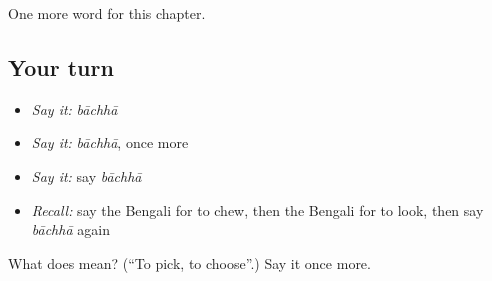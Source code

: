 \begin{grammarlens}[title={What you've built}]
One more word for this chapter.
\end{grammarlens}

\subsection*{Your turn}
\begin{itemize}
\raggedright
  \item \emph{Say it:} \emph{bāchhā}
  \item \emph{Say it:} \emph{bāchhā}, once more
  \item \emph{Say it:} say \emph{bāchhā}
  \item \emph{Recall:} say the Bengali for to chew, then the Bengali for to look, then say \emph{bāchhā} again
\end{itemize}

\begin{tcolorbox}[breakable,colback=teal!4,colframe=teal!35!black,title={Before you move on}]
What does  mean? (\textquotedblleft{}To pick, to choose\textquotedblright{}.) Say it once more.
\end{tcolorbox}
